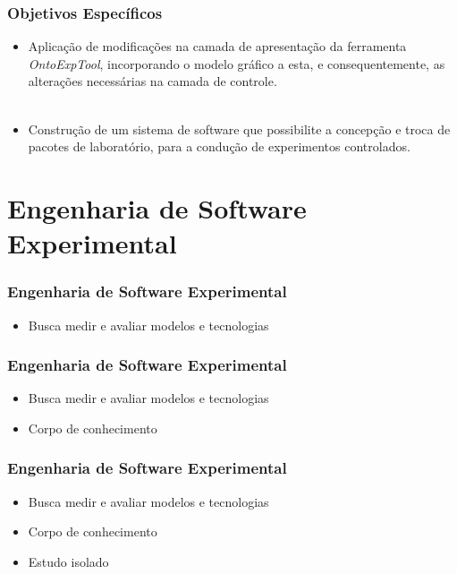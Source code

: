 \documentclass[aspectratio=169]{beamer}
\begin{document}
\begin{frame}
\frametitle{Objetivos Específicos}
\justifying

\begin{itemize}
\item Aplicação de modificações na camada de apresentação da ferramenta \textit{OntoExpTool}, incorporando o modelo gráfico a esta, e consequentemente, as alterações necessárias na camada de controle.
\\~\\
\item Construção de um sistema de software que possibilite a concepção e troca de pacotes de laboratório, para a condução de experimentos controlados.


\end{itemize}


\end{frame}

\section{Engenharia de Software Experimental}
\begin{frame}
\frametitle{Engenharia de Software Experimental}
\justifying

\begin{itemize}
\item Busca medir e avaliar modelos e tecnologias
\end{itemize}

\end{frame}

\begin{frame}
\frametitle{Engenharia de Software Experimental}
\justifying

\begin{itemize}
\item Busca medir e avaliar modelos e tecnologias
\item Corpo de conhecimento
\end{itemize}

\end{frame}

\begin{frame}
\frametitle{Engenharia de Software Experimental}
\justifying

\begin{itemize}
\item Busca medir e avaliar modelos e tecnologias
\item Corpo de conhecimento
\item Estudo isolado
\end{itemize}

\end{frame}
\end{document}

